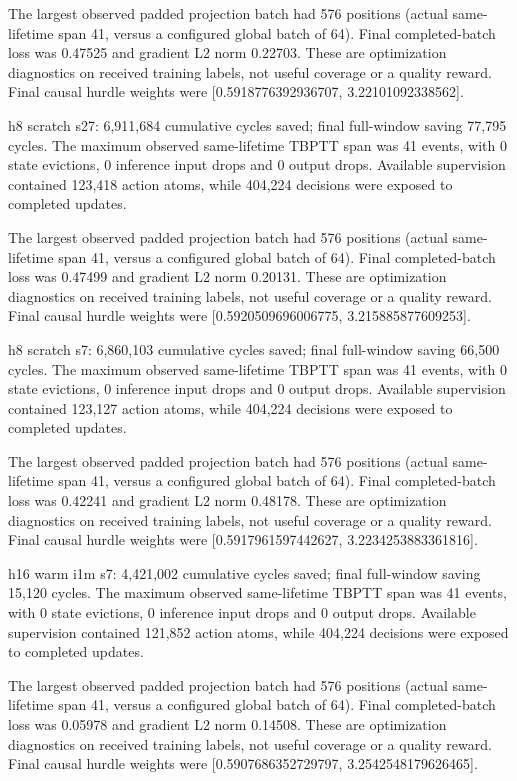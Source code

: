 \documentclass[10pt]{article}
\begin{document}
The largest observed padded projection batch had 576 positions (actual same-lifetime span 41, versus a configured global batch of 64). Final completed-batch loss was 0.47525 and gradient L2 norm 0.22703. These are optimization diagnostics on received training labels, not useful coverage or a quality reward. Final causal hurdle weights were [0.5918776392936707, 3.22101092338562].

h8 scratch s27: 6,911,684 cumulative cycles saved; final full-window saving 77,795 cycles. The maximum observed same-lifetime TBPTT span was 41 events, with 0 state evictions, 0 inference input drops and 0 output drops. Available supervision contained 123,418 action atoms, while 404,224 decisions were exposed to completed updates.

The largest observed padded projection batch had 576 positions (actual same-lifetime span 41, versus a configured global batch of 64). Final completed-batch loss was 0.47499 and gradient L2 norm 0.20131. These are optimization diagnostics on received training labels, not useful coverage or a quality reward. Final causal hurdle weights were [0.5920509696006775, 3.215885877609253].

h8 scratch s7: 6,860,103 cumulative cycles saved; final full-window saving 66,500 cycles. The maximum observed same-lifetime TBPTT span was 41 events, with 0 state evictions, 0 inference input drops and 0 output drops. Available supervision contained 123,127 action atoms, while 404,224 decisions were exposed to completed updates.

The largest observed padded projection batch had 576 positions (actual same-lifetime span 41, versus a configured global batch of 64). Final completed-batch loss was 0.42241 and gradient L2 norm 0.48178. These are optimization diagnostics on received training labels, not useful coverage or a quality reward. Final causal hurdle weights were [0.5917961597442627, 3.2234253883361816].

h16 warm i1m s7: 4,421,002 cumulative cycles saved; final full-window saving 15,120 cycles. The maximum observed same-lifetime TBPTT span was 41 events, with 0 state evictions, 0 inference input drops and 0 output drops. Available supervision contained 121,852 action atoms, while 404,224 decisions were exposed to completed updates.

The largest observed padded projection batch had 576 positions (actual same-lifetime span 41, versus a configured global batch of 64). Final completed-batch loss was 0.05978 and gradient L2 norm 0.14508. These are optimization diagnostics on received training labels, not useful coverage or a quality reward. Final causal hurdle weights were [0.5907686352729797, 3.2542548179626465].
\end{document}
